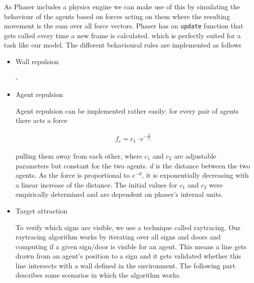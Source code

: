\documentclass[11pt]{article}
\begin{document}
As Phaser includes a physics engine we can make use of this by simulating the behaviour of the agents based on forces acting on them where the resulting movement is the sum over all force vectors. Phaser has an \texttt{update} function that gets called every time a new frame is calculated. which is perfectly suited for a task like our model. The different behavioural rules are implemented as follows

\begin{itemize}
    \item Wall repulsion
    
    -

    \item Agent repulsion
    
    Agent repulsion can be implemented rather easily: for every pair of agents there acts a force 
    
    \begin{align*}
    	f_r = c_1 \cdot e^{-\frac{d}{c_2}}
    \end{align*}
    
    pulling them away from each other, where $c_1$ and $c_2$ are adjustable parameters but constant for the two agents. $d$ is the distance between the two agents. As the force is proportional to $e^{-d}$, it is exponentially decreasing with a linear increase of the distance. The initial values for $c_1$ and $c_2$ were empirically determined and are dependent on phaser's internal units.

%    
%    
%    

    \item Target attraction
    
    To verify which signs are visible, we use a technique called raytracing. Our raytracing algorithm works by iterating over all signs and doors and computing if a given sign/door is visible for an agent. This means a line gets drawn from an agent's position to a sign and it gets validated whether this line intersects with a wall defined in the environment. The following part describes some scenarios in which the algorithm works.
    

\end{itemize}
\end{document}
